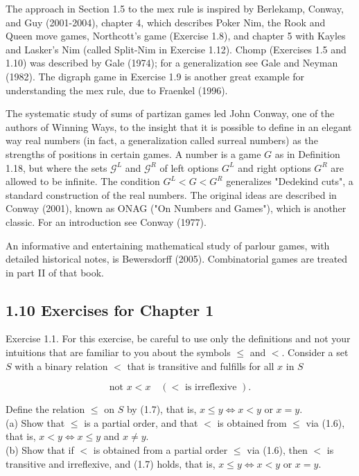 \documentclass[12pt]{article}
\begin{document}
The approach in Section 1.5 to the mex rule is inspired by Berlekamp, Conway, and Guy (2001-2004), chapter 4, which describes Poker Nim, the Rook and Queen move games, Northcott's game (Exercise 1.8), and chapter 5 with Kayles and Lasker's Nim (called Split-Nim in Exercise 1.12). Chomp (Exercises 1.5 and 1.10) was described by Gale (1974); for a generalization see Gale and Neyman (1982). The digraph game in Exercise 1.9 is another great example for understanding the mex rule, due to Fraenkel (1996).

The systematic study of sums of partizan games led John Conway, one of the authors of Winning Ways, to the insight that it is possible to define in an elegant way real numbers (in fact, a generalization called surreal numbers) as the strengths of positions in certain games. A number is a game $G$ as in Definition 1.18, but where the sets $\mathcal{G}^{L}$ and $\mathcal{G}^{R}$ of left options $G^{L}$ and right options $G^{R}$ are allowed to be infinite. The condition $G^{L}<G<G^{R}$ generalizes "Dedekind cuts", a standard construction of the real numbers. The original ideas are described in Conway (2001), known as ONAG ("On Numbers and Games"), which is another classic. For an introduction see Conway (1977).

An informative and entertaining mathematical study of parlour games, with detailed historical notes, is Bewersdorff (2005). Combinatorial games are treated in part II of that book.

\subsection*{1.10 Exercises for Chapter 1}
Exercise 1.1. For this exercise, be careful to use only the definitions and not your intuitions that are familiar to you about the symbols $\leq$ and $<$. Consider a set $S$ with a binary relation $<$ that is transitive and fulfills for all $x$ in $S$


\begin{equation*}
\text { not } x<x \quad(<\text { is irreflexive }) \text {. } \tag{1.38}
\end{equation*}


Define the relation $\leq$ on $S$ by (1.7), that is, $x \leq y \Leftrightarrow x<y$ or $x=y$.\\
(a) Show that $\leq$ is a partial order, and that $<$ is obtained from $\leq$ via (1.6), that is, $x<y \Leftrightarrow x \leq y$ and $x \neq y$.\\
(b) Show that if $<$ is obtained from a partial order $\leq$ via (1.6), then $<$ is transitive and irreflexive, and (1.7) holds, that is, $x \leq y \Leftrightarrow x<y$ or $x=y$.
\end{document}
